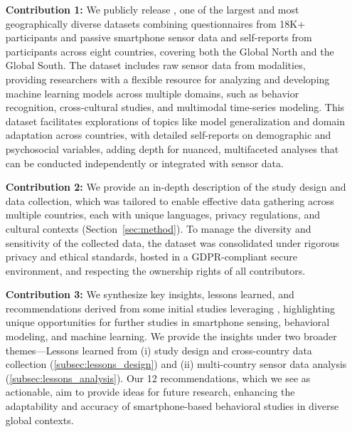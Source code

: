 \begin{itemize}[wide, labelwidth=!, labelindent=0pt]

\item[\textbf{Contribution 1:}] We publicly release \dataset, one of the largest and most geographically diverse datasets combining questionnaires from 18K+ participants and passive smartphone sensor data and self-reports from \nilogusers participants across eight countries, covering both the Global North and the Global South. The dataset includes raw sensor data from \nsensors modalities, providing researchers with a flexible resource for analyzing and developing machine learning models across multiple domains, such as behavior recognition, cross-cultural studies, and multimodal time-series modeling. This dataset facilitates explorations of topics like model generalization and domain adaptation across countries, with detailed self-reports on demographic and psychosocial variables, adding depth for nuanced, multifaceted analyses that can be conducted independently or integrated with sensor data.

\item[\textbf{Contribution 2:}] We provide an in-depth description of the study design and data collection, which was tailored to enable effective data gathering across multiple countries, each with unique languages, privacy regulations, and cultural contexts (Section~\ref{sec:method}). To manage the diversity and sensitivity of the collected data, the dataset was consolidated under rigorous privacy and ethical standards, hosted in a GDPR-compliant secure environment, and respecting the ownership rights of all contributors.


\item[\textbf{Contribution 3:}] We synthesize key insights, lessons learned, and recommendations derived from some initial studies leveraging \dataset, highlighting unique opportunities for further studies in smartphone sensing, behavioral modeling, and machine learning. We provide the insights under two broader themes---Lessons learned from (i) study design and cross-country data collection (\cref{subsec:lessons_design}) and (ii) multi-country sensor data analysis (\cref{subsec:lessons_analysis}). Our 12 recommendations, which we see as actionable, aim to provide ideas for future research, enhancing the adaptability and accuracy of smartphone-based behavioral studies in diverse global contexts.

\end{itemize}


